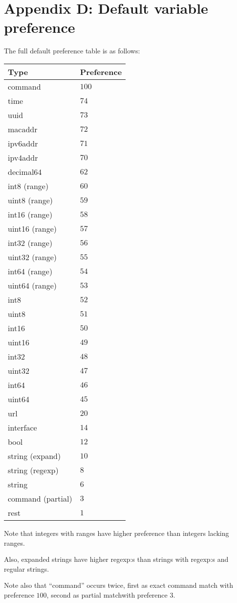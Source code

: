 \documentclass[a4paper, 10pt] {article}
\begin{document}
\newpage
\section*{Appendix D: Default variable preference}
\label{app:varpref}
The full default preference table is as follows:

\begin{tabular}{ | l | l | }
\hline
  \textbf{ Type} & \textbf{Preference} \\
\hline
command           & $100$  \\
time              & $74$   \\
uuid              & $73$   \\
macaddr           & $72$   \\
ipv6addr          & $71$   \\
ipv4addr          & $70$   \\
decimal64         & $62$   \\
int8 (range)      & $60$   \\
uint8 (range)     & $59$   \\
int16 (range)     & $58$   \\
uint16 (range)    & $57$   \\
int32 (range)     & $56$   \\
uint32 (range)    & $55$   \\
int64 (range)     & $54$   \\
uint64 (range)    & $53$   \\
int8              & $52$   \\
uint8             & $51$   \\
int16             & $50$   \\
uint16            & $49$   \\
int32             & $48$   \\
uint32            & $47$   \\
int64             & $46$   \\
uint64            & $45$   \\
url               & $20$   \\
interface         & $14$   \\
bool              & $12$   \\
string (expand)   & $10$   \\
string (regexp)   & $8$    \\
string            & $6$    \\
command (partial) & $3$    \\
rest              & $1$    \\
\hline
\end{tabular}

Note that integers with ranges have higher preference than integers lacking ranges.

Also, expanded strings have higher regexp:s than strings with regexp:s and regular strings.

Note also that ``command'' occurs twice, first as exact command match with preference $100$, second as partial matchwith preference $3$.
\end{document}
